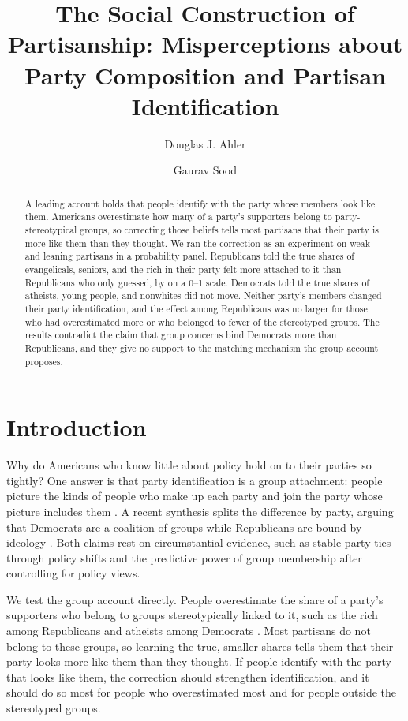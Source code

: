 \documentclass[11pt]{article}
\title{The Social Construction of Partisanship: Misperceptions about Party Composition and Partisan Identification}
\author{Douglas J. Ahler \and Gaurav Sood}
\date{}
\begin{document}
\maketitle

\begin{abstract}
\noindent A leading account holds that people identify with the party whose members look like them. Americans overestimate how many of a party's supporters belong to party-stereotypical groups, so correcting those beliefs tells most partisans that their party is more like them than they thought. We ran the correction as an experiment on \nTotal{} weak and leaning partisans in a probability panel. Republicans told the true shares of evangelicals, seniors, and the rich in their party felt more attached to it than Republicans who only guessed, by \repTellAsk{} on a 0--1 scale. Democrats told the true shares of atheists, young people, and nonwhites did not move. Neither party's members changed their party identification, and the effect among Republicans was no larger for those who had overestimated more or who belonged to fewer of the stereotyped groups. The results contradict the claim that group concerns bind Democrats more than Republicans, and they give no support to the matching mechanism the group account proposes.
\end{abstract}

\section{Introduction}

Why do Americans who know little about policy hold on to their parties so tightly? One answer is that party identification is a group attachment: people picture the kinds of people who make up each party and join the party whose picture includes them \citep{green2002, campbell1960, achen2016}. A recent synthesis splits the difference by party, arguing that Democrats are a coalition of groups while Republicans are bound by ideology \citep{grossmann2016}. Both claims rest on circumstantial evidence, such as stable party ties through policy shifts and the predictive power of group membership after controlling for policy views.

We test the group account directly. People overestimate the share of a party's supporters who belong to groups stereotypically linked to it, such as the rich among Republicans and atheists among Democrats \citep{ahler2018}. Most partisans do not belong to these groups, so learning the true, smaller shares tells them that their party looks more like them than they thought. If people identify with the party that looks like them, the correction should strengthen identification, and it should do so most for people who overestimated most and for people outside the stereotyped groups.
\end{document}
